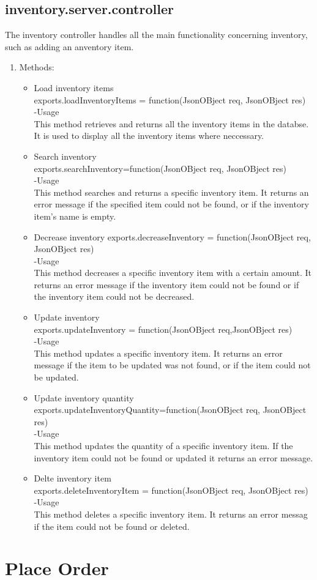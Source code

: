 \documentclass[a4paper,12pt]{article}
\begin{document}
\subsection{inventory.server.controller}
 The inventory controller handles all the main functionality concerning inventory, such as adding an anventory item.
 \begin{enumerate}
 \item Methods:
 	\begin{itemize}
 	\item Load inventory items\\
 	exports.loadInventoryItems = function(JsonOBject req, JsonOBject res)\\
 	-Usage\\
 	This method retrieves and returns all the inventory items in the databse. It is used to display all the inventory items where neccessary.
 	\item Search inventory\\
 	exports.searchInventory=function(JsonOBject req, JsonOBject res)\\
 	-Usage\\
 	This method searches and returns a specific inventory item. It returns an error message if the specified item could not be found, or if the inventory item's name is empty.
 	\item Decrease inventory
 	exports.decreaseInventory = function(JsonOBject req, JsonOBject res)\\
 	-Usage\\
 	This method decreases a specific inventory item with a certain amount. It returns an error message if the inventory item could not be found or if the inventory item could not be decreased.
 	\item Update inventory\\
 	exports.updateInventory = function(JsonOBject req,JsonOBject  res)\\
 	-Usage\\
 	This method updates a specific inventory item. It returns an error message if the item to be updated was  not found, or if the item could not be updated.
 	\item Update inventory quantity
 	exports.updateInventoryQuantity=function(JsonOBject req, JsonOBject res)\\
 	-Usage\\
 	This method updates the quantity of a specific inventory item. If the inventory item could not be found or updated it returns an error message.
 	\item Delte inventory item\\
 	exports.deleteInventoryItem = function(JsonOBject req, JsonOBject res)\\
 	-Usage\\
 	This method deletes a specific inventory item. It returns an error messag if the item could not be found or deleted.
 	\end{itemize}
 \end{enumerate}
\section{Place Order}


  
\end{document}
